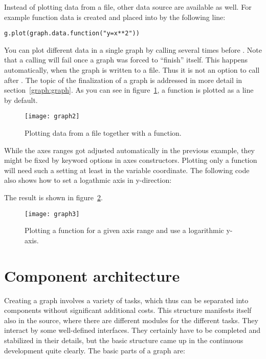 Instead of plotting data from a file, other data source are available
as well. For example function data is created and placed into
 by the following line:
\begin{verbatim}
g.plot(graph.data.function("y=x**2"))
\end{verbatim}
You can plot different data in a single graph by calling
 several times before . Note
that a calling  will fail once a graph was forced to
``finish'' itself. This happens automatically, when the graph is
written to a file. Thus it is not an option to call 
after . The topic of the finalization of a
graph is addressed in more detail in section~\ref{graph:graph}. As you
can see in figure~\ref{fig:graph2}, a function is plotted as a line by
default.

\begin{figure}[ht]
\centerline{\texttt{[image: graph2]}}
\caption{Plotting data from a file together with a function.}
\label{fig:graph2}
\end{figure}

While the axes ranges got adjusted automatically in the previous
example, they might be fixed by keyword options in axes constructors.
Plotting only a function will need such a setting at least in the
variable coordinate. The following code also shows how to set a
logathmic axis in y-direction:



The result is shown in figure~\ref{fig:graph3}.

\begin{figure}[ht]
\centerline{\texttt{[image: graph3]}}
\caption{Plotting a function for a given axis range and use a
logarithmic y-axis.}
\label{fig:graph3}
\end{figure}

\section{Component architecture}
\label{graph:components}

Creating a graph involves a variety of tasks, which thus can be
separated into components without significant additional costs.
This structure manifests itself also in the \PyX{} source, where there
are different modules for the different tasks. They interact by some
well-defined interfaces. They certainly have to be completed and
stabilized in their details, but the basic structure came up in the
continuous development quite clearly. The basic parts of a graph are:

